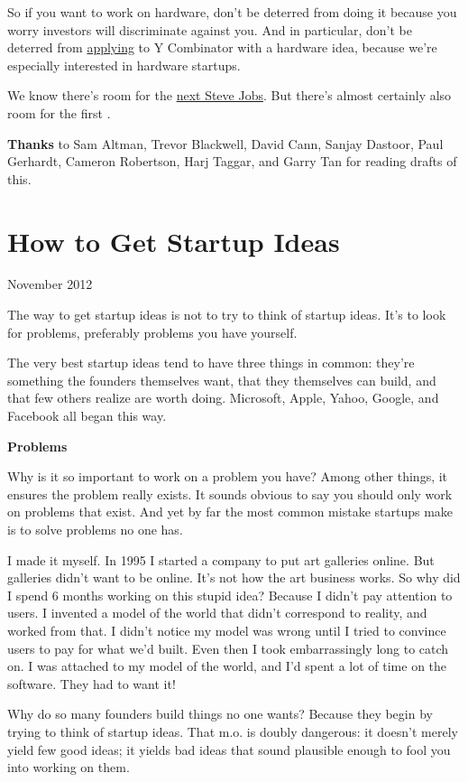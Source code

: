 \documentclass[12pt]{book}
\begin{document}
So if you want to work on hardware, don't be deterred from doing it
because you worry investors will discriminate against you. And in
particular, don't be deterred from
\href{http://ycombinator.com/apply.html}{applying} to Y Combinator with
a hardware idea, because we're especially interested in hardware
startups.

We know there's room for the \href{ambitious.html}{next Steve Jobs}. But
there's almost certainly also room for the first .

\textbf{Thanks} to Sam Altman, Trevor Blackwell, David Cann, Sanjay
Dastoor, Paul Gerhardt, Cameron Robertson, Harj Taggar, and Garry Tan
for reading drafts of this.
\chapter{How to Get Startup Ideas}

November 2012

The way to get startup ideas is not to try to think of startup ideas.
It's to look for problems, preferably problems you have yourself.

The very best startup ideas tend to have three things in common: they're
something the founders themselves want, that they themselves can build,
and that few others realize are worth doing. Microsoft, Apple, Yahoo,
Google, and Facebook all began this way.

\textbf{Problems}

Why is it so important to work on a problem you have? Among other
things, it ensures the problem really exists. It sounds obvious to say
you should only work on problems that exist. And yet by far the most
common mistake startups make is to solve problems no one has.

I made it myself. In 1995 I started a company to put art galleries
online. But galleries didn't want to be online. It's not how the art
business works. So why did I spend 6 months working on this stupid idea?
Because I didn't pay attention to users. I invented a model of the world
that didn't correspond to reality, and worked from that. I didn't notice
my model was wrong until I tried to convince users to pay for what we'd
built. Even then I took embarrassingly long to catch on. I was attached
to my model of the world, and I'd spent a lot of time on the software.
They had to want it!

Why do so many founders build things no one wants? Because they begin by
trying to think of startup ideas. That m.o. is doubly dangerous: it
doesn't merely yield few good ideas; it yields bad ideas that sound
plausible enough to fool you into working on them.
\end{document}

